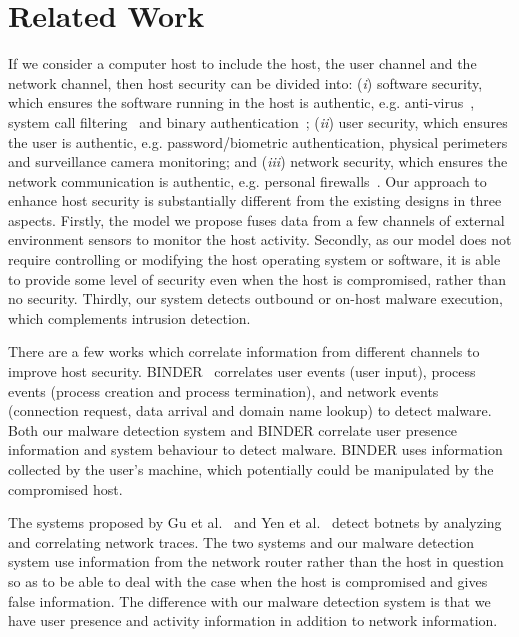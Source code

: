 \section{Related Work}
\label{sec:sensor-related}

If we consider a computer host to include the host, the user channel
and the network channel, then host security can be divided into:
({\it i}) software security, which ensures the software running in
the host is authentic, e.g. anti-virus~\cite{post1998use}, system call
filtering~\cite{provos2003improving} and
binary authentication~\cite{halim2008lightweight};
({\it ii}) user security, which ensures the user is authentic, e.g.
password/biometric authentication, physical perimeters and
surveillance camera monitoring; and ({\it iii}) network security,
which ensures the network communication is authentic, e.g. personal
firewalls~\cite{ingham2002history}. Our approach to enhance host
security is substantially different from the existing designs in
three aspects. Firstly, the model we propose fuses data from a few
channels of external environment sensors to monitor the host
activity. Secondly, as our model does not require controlling or
modifying the host operating system or software, it is able to provide some
level of security even when the host is compromised, rather than no security. 
Thirdly, our system
detects outbound or on-host malware execution, which complements
intrusion detection.

There are a few works which correlate information from different
channels to improve host security. BINDER~\cite{cui2005design}
correlates user events (user input), process events (process
creation and process termination), and network events (connection
request, data arrival and domain name lookup) to detect malware.
Both our malware detection system and BINDER correlate user presence
information and system behaviour to detect malware. BINDER uses
information collected by the user's machine, which potentially could
be manipulated by the compromised host.

The systems proposed by Gu et al.~\cite{gu2007bothunter} and
Yen et al.~\cite{yen2008traffic} detect botnets by analyzing and
correlating network traces.
The two systems and our malware detection system use
information from the network router rather than the host in question
so as to be able to deal with the case when the host is compromised
and gives false information. The difference with our malware
detection system is that we have user presence and activity
information in addition to network information.

